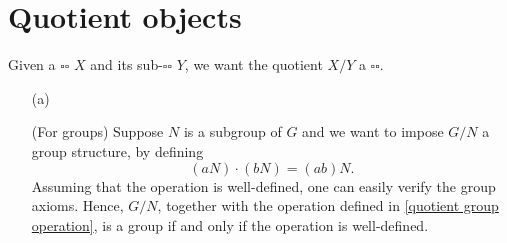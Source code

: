 \section{Quotient objects}

Given a $\square\square$ $X$ and its sub-$\square\square$ $Y$, we want the quotient $X/Y$ a $\square\square$.
\begin{exmp}
    \begin{enumerate}
        \item[(a)]
        {
            (For groups)
            Suppose $N$ is a subgroup of $G$ and we want to impose $G/N$ a group structure, by defining
            \begin{equation}\label{quotient group operation}
                (aN)\cdot(bN)=(ab)N.
            \end{equation}
            Assuming that the operation is well-defined, one can easily verify the group axioms.
            Hence, $G/N$, together with the operation defined in \cref{quotient group operation}, is a group if and only if the operation is well-defined.
            
}
\end{enumerate}
\end{exmp}
